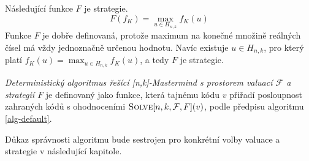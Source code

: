 
\begin{prikl}\label{prstrategie}
    Následující funkce $F$ je strategie.
    \[F(f_K) =  \max_{u\in H_{n,k}} f_K(u)\]
    Funkce $F$ je dobře definovaná, protože maximum na konečné množině reálných čísel má vždy jednoznačně určenou hodnotu. Navíc existuje $u\in H_{n,k}$, pro který platí $f_K(u) = \max_{u\in H_{n,k}} f_K(u)$, a tedy $F$ je strategie.
\end{prikl}

\begin{definice}\label{defobecnyalg}
    \emph{Deterministický algoritmus řešící [n,k]-Mastermind s prostorem valuací $\mathcal{F}$ a strategií $F$} je definovaný jako funkce, která tajnému kódu $v$ přiřadí posloupnost zahraných kódů s ohodnoceními $\textsc{Solve}[n, k, \mathcal{F}, F](v)$, podle předpisu algoritmu \ref{alg-default}.
    
    
    
\end{definice}
\begin{pozn}
    Důkaz správnosti algoritmu bude sestrojen pro konkrétní volby valuace a strategie v následující kapitole. 
\end{pozn}








